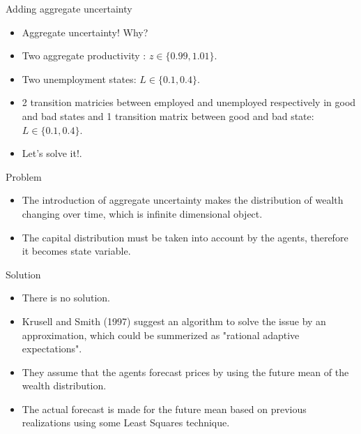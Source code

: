 \documentclass{beamer}
\begin{document}
\begin{frame}{Adding aggregate uncertainty}
  \begin{itemize}

  \item {
  Aggregate uncertainty! Why?
  }
  \pause
  \item {
  Two aggregate productivity : $z \in \{ 0.99, 1.01 \}$.
  }

  \item {
  Two unemployment states: $L \in \{ 0.1, 0.4 \}$.
  }

  \item {
  2 transition matricies between employed and unemployed respectively in good and bad states and 1 transition matrix between good and bad state: $L \in \{ 0.1, 0.4 \}$.
  }

  \pause

  \item {
  Let's solve it!.
  }

  

  \end{itemize}

\end{frame}

\begin{frame}{Problem}
  \begin{itemize}

  \item {
  The introduction of aggregate uncertainty makes the distribution of wealth changing over time, which is infinite dimensional object.
  }
  
  \item {
  The capital distribution must be taken into account by the agents, therefore it becomes state variable.
  }
 

  \end{itemize}

\end{frame}

\begin{frame}{Solution}
  \begin{itemize}

  \item {
  There is no solution.
  }
  
  \item {
  Krusell and Smith (1997) suggest an algorithm to solve the issue by an approximation, which could be summerized as "rational adaptive expectations".
  }

  \item {
  They assume that the agents forecast prices by using the future mean of the wealth distribution.
  }

  \item {
  The actual forecast is made for the future mean based on previous realizations using some Least Squares technique.
  }
 

  \end{itemize}

\end{frame}
\end{document}
